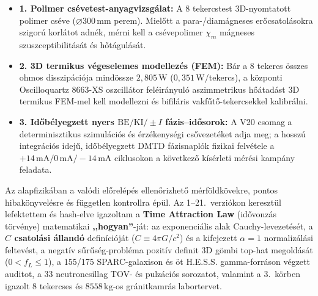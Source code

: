 \documentclass[10pt,a4paper]{article}
\begin{document}
{
\begin{itemize}\setlength{\itemsep}{1pt}\setlength{\parskip}{0pt}\setlength{\topsep}{1pt}
  \item \textbf{1. Polimer cs\'evetest-anyagvizsg\'alat:} A 8 tekercstest 3D-nyomtatott polimer cs\'eve ($\varnothing 300\,\text{mm}$ perem). Miel\H{o}tt a para-/diam\'agneses er\H{o}csatol\'asokra szigor\'u korl\'atot adn\'ek, m\'erni kell a cs\'evepolimer $\chi_m$ m\'agneses szuszceptibilit\'as\'at \'es h\H{o}t\'agul\'as\'at.
  \item \textbf{2. 3D termikus v\'egeselemes modellez\'es (FEM):} B\'ar a 8 tekercs \"osszes ohmos disszip\'aci\'oja mind\"ossze $2{,}805\,\text{W}$ ($0{,}351\,\text{W}$/tekercs), a k\"ozponti Oscilloquartz 8663-XS oszcill\'ator fel\'eir\'anyul\'o aszimmetrikus h\H{o}\'atad\'ast 3D termikus FEM-mel kell modellezni \'es bifil\'aris vakf\H{u}t\H{o}-tekercsekkel kalibr\'alni.
  \item \textbf{3. Id\H{o}b\'elyegzett nyers $\text{BE}/\text{KI}/\pm I$ f\'azis--id\H{o}sorok:} A V20 csomag a determinisztikus szimul\'aci\'os \'es \'erz\'ekenys\'egi cs\H{o}vezet\'eket adja meg; a hossz\'u integr\'aci\'os idej\H{u}, id\H{o}b\'elyegzett DMTD f\'azisnapl\'ok fizikai felv\'etele a $+14\,\text{mA} / 0\,\text{mA} / -14\,\text{mA}$ ciklusokon a k\"ovetkez\H{o} k\'is\'erleti m\'er\'esi kamp\'any feladata.
\end{itemize}

\vspace{0.5mm}
\noindent{\color{navy}\rule{\linewidth}{0.6pt}}\par\vspace{0.8mm}
\par\vspace{0.5pt}
Az alapfizik\'aban a val\'odi el\H{o}rel\'ep\'es ellen\H{o}rizhet\H{o} m\'erf\"oldk\"ovekre, pontos hibak\"onyvel\'esre \'es f\"uggetlen kontrollra \'ep\"ul. Az 1--21.\ verzi\'okon kereszt\"ul lefektettem \'es hash-elve igazoltam a \textbf{Time Attraction Law} (id\H{o}vonz\'as t\"orv\'enye) matematikai \textbf{,,hogyan''}-j\'at: az exponenci\'alis alak Cauchy-levezet\'es\'et, a \textbf{$C$ csatol\'asi \'alland\'o} defin\'ici\'oj\'at ($C \equiv 4\pi G/c^2$) \'es a kifejezett $\alpha = 1$ normaliz\'al\'asi feltev\'est, a negat\'iv s\H{u}r\H{u}s\'eg-probl\'ema pozit\'iv definit 3D g\"ombi top-hat megold\'as\'at ($0 < f_L \le 1$), a 155/175 SPARC-galaxison \'es \"ot H.E.S.S. gamma-forr\'ason v\'egzett auditot, a 33 neutroncsillag TOV- \'es pulz\'aci\'os sorozatot, valamint a 3.\ k\"orben igazolt 8 tekercses \'es $8558\,\text{kg}$-os gr\'anitkamr\'as labortervet.

}
\end{document}
